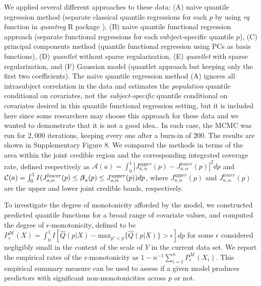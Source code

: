\documentclass[11pt]{article}
\newcommand{\bbeta}{\mbox{\boldmath $\beta$}}
\begin{document}
We applied several different approaches to these data: 
(A) naive quantile regression method (separate classical quantile regressions for each $p$ 
 by using  \textit{rq} function in {\it quantreg} R package \cite{koenker2005quantile}
),
 (B) naive quantile functional regression approach (separate functional regressions for each subject-specific quantile $p$),
    (C) principal components method (quantile functional regression using PCs as basis functions),
(D) {\it quantlet} without sparse regularization, (E) {\it quantlet} with sparse regularization, and 
(F) Gaussian model (quantlet approach but keeping only the first two coefficients).
The naive quantile regression method (A) ignores all intrasubject correlation in the data and estimates the \textit{population} quantile conditional on covariates, not the \textit{subject-specific} quantile conditional on covariates desired in this quantile functional regression setting, but it is included here since some researchers may choose this approach for these data and we wanted to demonstrate that it is not a good idea..  
In each case, the MCMC was run for $2,000$ iterations, keeping every one after a burn-in of $200$.
The results are shown in Supplementary Figure 8. %
 We compared the methods in terms of the area within the joint credible region and the 
corresponding integrated coverage rate, defined respectively as 
$\mathcal{A}(a)= \int_{0}^{1} | J_{a,\alpha}^{upper}(p) -  J_{a,\alpha}^{lower}(p) |^2 dp$ and
$ \mathcal{C}(a)= \int_{0}^{1} I( J_{a,\alpha}^{lower}(p) \le {\bbeta}_a(p)
  \le J_{a,\alpha}^{upper}(p) ) dp$,
where $J_{a,\alpha}^{upper}(p)$ and $J_{a,\alpha}^{lower}(p)$ are
the upper and lower joint credible bands, respectively.

To investigate the degree of monotonicity afforded by the model, we constructed predicted quantile functions for a broad range of covariate values, and computed the degree of $\epsilon$-monotonicity, defined to be $P^\mathcal{M}_\epsilon(X)=\int_0^1 I[\widehat{Q}(p|X)-\text{max}_{p'<p}\{\widehat{Q}(p|X)\}>\epsilon] dp$ for some $\epsilon$ considered negligibly small in the context of the scale of $Y$ in the current data set.  
 We report the empirical rates of the $\epsilon$-monotonicity as $1-n^{-1}\sum_{i=1}^{n}P^\mathcal{M}_\epsilon(X_i)$.  This empirical summary measure can be used to assess if a given model produces predictors with significant non-monotonicities across $p$ or not.
\end{document}
